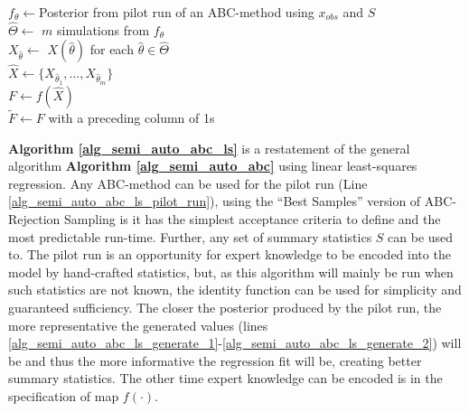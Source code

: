 \documentclass[bibliography=totoc,11pt,a4paper,margin=0]{article}
\theoremstyle{break}
\begin{document}
  \begin{box_algorithm}\label{alg_semi_auto_abc_ls}
    \begin{algorithm}[H]
      $f_\theta\leftarrow$Posterior from pilot run of an ABC-method using $x_{obs}$ and $S$\label{alg_semi_auto_abc_ls_pilot_run}\\
      $\hat\Theta\leftarrow$ $m$ simulations from $f_\theta$\label{alg_semi_auto_abc_ls_generate_1}\\
      $X_{\hat\theta}\leftarrow$ $X\left(\hat\theta\right)$ for each $\hat\theta\in\hat\Theta$\label{alg_semi_auto_abc_ls_generate_2}\\
      $\hat{X}\leftarrow\{X_{\hat\theta_1},\dots,X_{\hat\theta_m}\}$\\
      $F\leftarrow f(\hat{X})$\\
      $\tilde{F}\leftarrow F$ with a preceding column of 1s\\
    \end{algorithm}
  \end{box_algorithm}

  \par \textbf{Algorithm \ref{alg_semi_auto_abc_ls}} is a restatement of the general algorithm \textbf{Algorithm \ref{alg_semi_auto_abc}} using linear least-squares regression. Any ABC-method can be used for the pilot run (Line \ref{alg_semi_auto_abc_ls_pilot_run}), using the ``Best Samples'' version of ABC-Rejection Sampling is it has the simplest acceptance criteria to define and the most predictable run-time. Further, any set of summary statistics $S$ can be used to. The pilot run is an opportunity for expert knowledge to be encoded into the model by hand-crafted statistics, but, as this algorithm will mainly be run when such statistics are not known, the identity function can be used for simplicity and guaranteed sufficiency. The closer the posterior produced by the pilot run, the more representative the generated values (lines \ref{alg_semi_auto_abc_ls_generate_1}-\ref{alg_semi_auto_abc_ls_generate_2}) will be and thus the more informative the regression fit will be, creating better summary statistics. The other time expert knowledge can be encoded is in the specification of map $f(\cdot)$.
\end{document}
